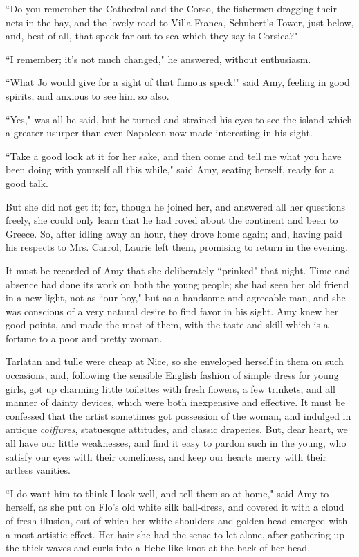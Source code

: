 ``Do you remember the Cathedral and the Corso, the fishermen dragging
their nets in the bay, and the lovely road to Villa Franca,
Schubert's Tower, just below, and, best of all, that
speck far out to sea which they say is Corsica?"

``I remember; it's not much changed," he answered,
without enthusiasm.

``What Jo would give for a sight of that famous speck!" said Amy, feeling
in good spirits, and anxious to see him so also.

``Yes," was all he said, but he turned and strained his eyes to see the
island which a greater usurper than even Napoleon now made interesting
in his sight.

``Take a good look at it for her sake, and then come and tell me what you
have been doing with yourself all this while," said Amy, seating
herself, ready for a good talk.

But she did not get it; for, though he joined her, and answered all her
questions freely, she could only learn that he had roved about the
continent and been to Greece. So, after idling away an hour, they drove
home again; and, having paid his respects to Mrs. Carrol, Laurie left
them, promising to return in the evening.

It must be recorded of Amy that she deliberately ``prinked" that night.
Time and absence had done its work on both the young people; she had
seen her old friend in a new light, not as ``our boy," but as a handsome
and agreeable man, and she was conscious of a very natural desire to
find favor in his sight. Amy knew her good points, and made the most of
them, with the taste and skill which is a fortune to a poor and pretty
woman.

Tarlatan and tulle were cheap at Nice, so she enveloped herself in them
on such occasions, and, following the sensible English fashion of simple
dress for young girls, got up charming little toilettes with fresh
flowers, a few trinkets, and all manner of dainty devices, which were
both inexpensive and effective. It must be confessed that the artist
sometimes got possession of the woman, and indulged in antique
\emph{coiffures}, statuesque attitudes, and classic draperies. But, dear
heart, we all have our little weaknesses, and find it easy to pardon
such in the young, who satisfy our eyes with their comeliness, and keep
our hearts merry with their artless vanities.

``I do want him to think I look well, and tell them so at home," said Amy
to herself, as she put on Flo's old white silk
ball-dress, and covered it with a cloud of fresh illusion, out of which
her white shoulders and golden head emerged with a most artistic effect.
Her hair she had the sense to let alone, after gathering up the thick
waves and curls into a Hebe-like knot at the back of her head.

